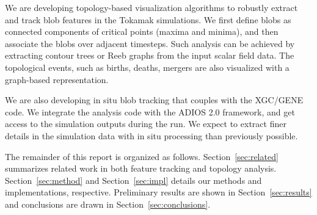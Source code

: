 We are developing topology-based visualization algorithms to robustly extract and track blob features in the Tokamak simulations.  We first define blobs as connected components of critical points (maxima and minima), and then associate the blobs over adjacent timesteps.  Such analysis can be achieved by extracting contour trees or Reeb graphs from the input scalar field data.  The topological events, such as births, deaths, mergers are also visualized with a graph-based representation. %

We are also developing in situ blob tracking that couples with the XGC/GENE code.  We integrate the analysis code with the ADIOS 2.0 framework, and get access to the simulation outputs during the run.  We expect to extract finer details in the simulation data with in situ processing than previously possible.  

The remainder of this report is organized as follows.  Section~\ref{sec:related} summarizes related work in both feature tracking and topology analysis.  Section~\ref{sec:method} and Section~\ref{sec:impl} details our methods and implementations, respective.  Preliminary results are shown in Section~\ref{sec:results} and conclusions are drawn in Section~\ref{sec:conclusions}.  